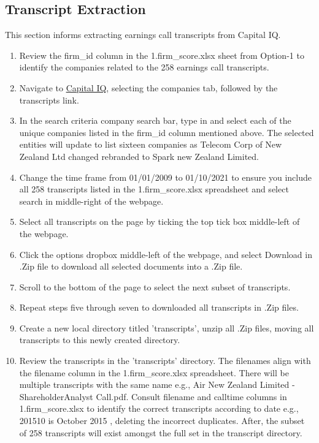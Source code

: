 \documentclass[11pt]{article}
\begin{document}
\subsection{Transcript Extraction}
This section informs extracting earnings call transcripts from Capital IQ.
\begin{enumerate}
    \item Review the firm\_id column in the 1.firm\_score.xlsx sheet from Option-1 to identify the companies related to the 258 earnings call transcripts.
    \item Navigate to \hyperlink{https://www.capitaliq.com/}{Capital IQ}, selecting the companies tab, followed by the transcripts link.
    \item In the search criteria company search bar, type in and select each of the unique companies listed in the firm\_id column mentioned above.
    The selected entities will update to list sixteen companies as Telecom Corp of New Zealand Ltd changed rebranded to Spark new Zealand Limited.
    \item Change the time frame from 01/01/2009 to 01/10/2021 to ensure you include all 258 transcripts listed in the 1.firm\_score.xlsx spreadsheet and select search in middle-right of the webpage.
    \item Select all transcripts on the page by ticking the top tick box middle-left of the webpage.
    \item Click the options dropbox middle-left of the webpage, and select Download in .Zip file to download all selected documents into a .Zip file.
    \item Scroll to the bottom of the page to select the next subset of transcripts.
    \item Repeat steps five through seven to downloaded all transcripts in .Zip files.
    \item Create a new local directory titled 'transcripts', unzip all .Zip files, moving all transcripts to this newly created directory.
    \item Review the transcripts in the 'transcripts' directory. The filenames align with the filename column in the 1.firm\_score.xlsx spreadsheet. 
    There will be multiple transcripts with the same name e.g., Air New Zealand Limited - ShareholderAnalyst Call.pdf. 
    Consult filename and calltime columns in 1.firm\_score.xlsx to identify the correct transcripts according to date e.g., 201510 is October 2015 , deleting the incorrect duplicates.
    After, the subset of 258 transcripts will exist amongst the full set in the transcript directory.
\end{enumerate}
\end{document}
